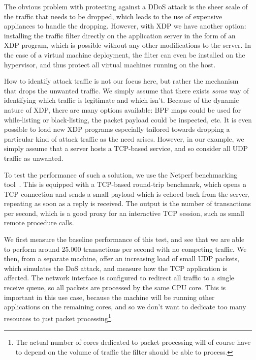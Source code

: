 \documentclass[10pt,sigconf]{acmart}
\begin{document}
The obvious problem with protecting against a DDoS attack is the sheer scale of
the traffic that needs to be dropped, which leads to the use of expensive
appliances to handle the dropping. However, with XDP we have another option:
installing the traffic filter directly on the application server in the form of
an XDP program, which is possible without any other modifications to the server.
In the case of a virtual machine deployment, the filter can even be installed on
the hypervisor, and thus protect all virtual machines running on the host.

How to identify attack traffic is not our focus here, but rather the mechanism
that drops the unwanted traffic. We simply assume that there exists \emph{some}
way of identifying which traffic is legitimate and which isn't. Because of the
dynamic nature of XDP, there are many options available: BPF maps could be used
for while-listing or black-listing, the packet payload could be inspected, etc.
It is even possible to load new XDP programs especially tailored towards
dropping a particular kind of attack traffic as the need arises. However, in our
example, we simply assume that a server hosts a TCP-based service, and so
consider all UDP traffic as unwanted.

To test the performance of such a solution, we use the Netperf benchmarking
tool~\cite{netperf}. This is equipped with a TCP-based round-trip benchmark,
which opens a TCP connection and sends a small payload which is echoed back from
the server, repeating as soon as a reply is received. The output is the number
of transactions per second, which is a good proxy for an interactive TCP
session, such as small remote procedure calls.

We first measure the baseline performance of this test, and see that we are able
to perform around 25.000 transactions per second with no competing traffic. We
then, from a separate machine, offer an increasing load of small UDP packets,
which simulates the DoS attack, and measure how the TCP application is affected.
The network interface is configured to redirect all traffic to a single receive
queue, so all packets are processed by the same CPU core. This is important in
this use case, because the machine will be running other applications on the
remaining cores, and so we don't want to dedicate too many resources to just
packet processing\footnote{The actual number of cores dedicated to packet
  processing will of course have to depend on the volume of traffic the filter
  should be able to process.}.
\end{document}
